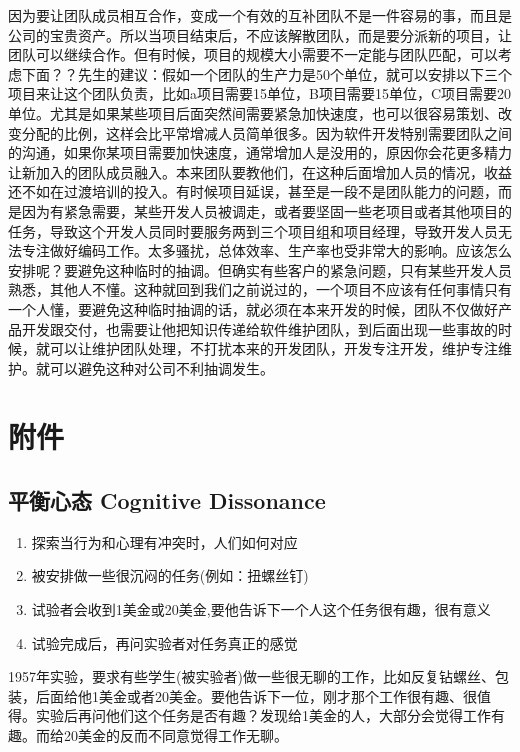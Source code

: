 因为要让团队成员相互合作，变成一个有效的互补团队不是一件容易的事，而且是公司的宝贵资产。所以当项目结束后，不应该解散团队，而是要分派新的项目，让团队可以继续合作。但有时候，项目的规模大小需要不一定能与团队匹配，可以考虑下面？？先生的建议：假如一个团队的生产力是50个单位，就可以安排以下三个项目来让这个团队负责，比如a项目需要15单位，B项目需要15单位，C项目需要20单位。尤其是如果某些项目后面突然间需要紧急加快速度，也可以很容易策划、改变分配的比例，这样会比平常增减人员简单很多。因为软件开发特别需要团队之间的沟通，如果你某项目需要加快速度，通常增加人是没用的，原因你会花更多精力让新加入的团队成员融入。本来团队要教他们，在这种后面增加人员的情况，收益还不如在过渡培训的投入。有时候项目延误，甚至是一段不是团队能力的问题，而是因为有紧急需要，某些开发人员被调走，或者要坚固一些老项目或者其他项目的任务，导致这个开发人员同时要服务两到三个项目组和项目经理，导致开发人员无法专注做好编码工作。太多骚扰，总体效率、生产率也受非常大的影响。应该怎么安排呢？要避免这种临时的抽调。但确实有些客户的紧急问题，只有某些开发人员熟悉，其他人不懂。这种就回到我们之前说过的，一个项目不应该有任何事情只有一个人懂，要避免这种临时抽调的话，就必须在本来开发的时候，团队不仅做好产品开发跟交付，也需要让他把知识传递给软件维护团队，到后面出现一些事故的时候，就可以让维护团队处理，不打扰本来的开发团队，开发专注开发，维护专注维护。就可以避免这种对公司不利抽调发生。


\hypertarget{ux9644ux4ef6}{%
\section{附件}\label{ux9644ux4ef6}}

\hypertarget{a1ux5e73ux8861ux5fc3ux6001-cognitive-dissonance}{%
\subsection{平衡心态 Cognitive
Dissonance}\label{a1ux5e73ux8861ux5fc3ux6001-cognitive-dissonance}}


\begin{enumerate}
\tightlist
\item
  探索当行为和心理有冲突时，人们如何对应
\item
  被安排做一些很沉闷的任务(例如：扭螺丝钉)
\item
  试验者会收到1美金或20美金,要他告诉下一个人这个任务很有趣，很有意义
\item
  试验完成后，再问实验者对任务真正的感觉
\end{enumerate}



1957年实验，要求有些学生(被实验者)做一些很无聊的工作，比如反复钻螺丝、包装，后面给他1美金或者20美金。要他告诉下一位，刚才那个工作很有趣、很值得。实验后再问他们这个任务是否有趣？发现给1美金的人，大部分会觉得工作有趣。而给20美金的反而不同意觉得工作无聊。\\

